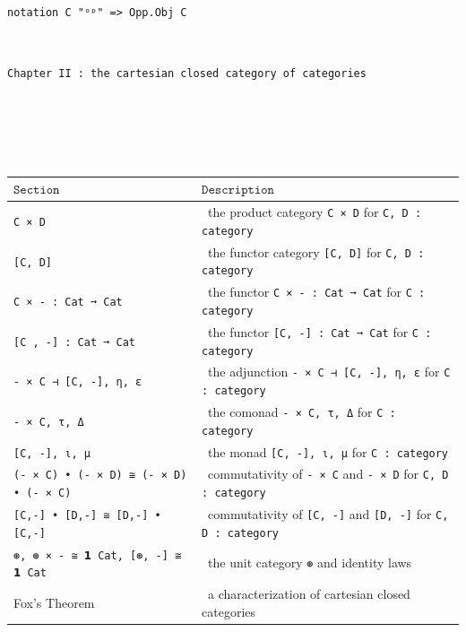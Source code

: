 \documentclass{book}
\newcounter{lcounter}
\begin{document}
\begin{center}
\begin{tcolorbox}[width=5in,colback={white},title={\begin{center}\texttt{Lean \thelcounter} \addtocounter{lcounter}{1}  \end{center}},colbacktitle=Green,coltitle=black]
\begin{verbatim}

notation C "ᵒᵖ" => Opp.Obj C

\end{verbatim}%
\end{tcolorbox}
\end{center}


\newpage
\ \\
{
\Huge 
\begin{center}
\texttt{Chapter II : the cartesian closed category of categories}
\end{center}
\thispagestyle{empty}
}

\ \\
\ \\
\ \\
\ \\

{
\small
\begin{center}
\begin{tabular}{|l | l |} 
 \hline
 $\texttt{Section}$ & $\texttt{Description}$ \\
 \hline \hline
 \texttt{C × D} &\ the product category \texttt{C × D} for \texttt{C, D : category} \\
 \hline
 \texttt{[C, D]} &\ the functor category \texttt{[C, D]} for \texttt{C, D : category} \\
 \hline 
 \texttt{C × - : Cat ➞ Cat} &\ the functor \texttt{C × - : Cat ➞ Cat} for \texttt{C : category}\\
 \hline
 \texttt{[C , -] : Cat ➞ Cat} &\ the functor \texttt{[C, -] : Cat ➞ Cat} for \texttt{C : category}  \\ 
 \hline
 \texttt{- × C ⊣ [C, -], η, ε} &\ the adjunction \texttt{- × C ⊣ [C, -], η, ε} for \texttt{C : category} \\
 \hline
 \texttt{- × C, τ, Δ} &\ the comonad \texttt{- × C, τ, Δ} for \texttt{C : category}  \\
 \hline
 \texttt{[C, -], ι, μ} &\ the monad \texttt{[C, -], ι, μ} for \texttt{C : category}  \\
 \hline
 \texttt{(- × C) • (- × D) ≅ (- × D) • (- × C)} &\ commutativity of \texttt{- × C} and \texttt{- × D} for \texttt{C, D : category} \\
 \hline 
 \texttt{[C,-] • [D,-] ≅ [D,-] • [C,-]} &\ commutativity of \texttt{[C, -]} and \texttt{[D, -]} for \texttt{C, D : category} \\
 \hline
 \texttt{⊛, ⊛ × - ≅ 𝟭 Cat, [⊛, -] ≅ 𝟭 Cat} &\ the unit category \texttt{⊛} and identity laws \\
 \hline
 Fox's Theorem &\ a characterization of cartesian closed categories \\
 \hline
\end{tabular}
\end{center}
}
\end{document}

